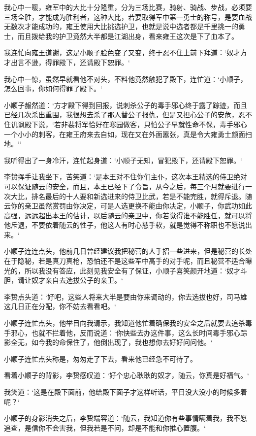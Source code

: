我心中一暖，雍军中的大比十分隆重，分为三场比赛，骑射、骑战、步战，必须要三场全胜，才能成为胜利者，这种大比，若要取得军中第一勇士的称号，是要血战无数次才能成功的，雍王使用大比挑选护卫，也就是说中选者都是千里挑一的勇士，而且拨给我的护卫竟然大半都是江湖出身，看来雍王这次是下了血本了。

我连忙向雍王道谢，这是小顺子脸色变了又变，终于忍不住上前下拜道：‘奴才方才出言不逊，得罪殿下，还请殿下恕罪。‘

我心中一惊，虽然早就看他不对头，不料他竟然触犯了殿下，连忙道：‘小顺子，怎么回事，你如何得罪了殿下。‘

小顺子赧然道：‘方才殿下得到回报，说刺杀公子的毒手邪心终于露了踪迹，而且已经几次杀出重围，我很想去杀了那人替公子报仇，但是又担心公子的安危，忍不住讥讽殿下说，‘若非裴将军恰好在寒园做客，只怕公子早就性命不保，毒手邪心一个小小的刺客，在雍王府来去自如，现在又在外面嚣张，真是令大雍勇士颜面扫地。‘‘

我听得出了一身冷汗，连忙起身道：‘小顺子无知，冒犯殿下，还请殿下恕罪。‘

李贽挥手让我坐下，苦笑道：‘是本王对不住你们主仆，这次本王精选的侍卫绝对可以保证随云的安全，而且，本王已经下了令旨，从今之后，每三个月就要进行一次大比，排名最后的十人要和新选进来的侍卫比武，若是不能完胜，就得斥退。随云你的亲卫虽然赏罚由你决定，可是人选更换不能由你决定，小顺子，你武功如此高强，远远超出本王的估计，以后随云的亲卫中，你若觉得谁不能胜任，就可以将他斥退，不要依着随云的性子，他这人有时心慈手软，就是觉得不称职也不愿说出来。‘

小顺子连连点头，他前几日曾经建议我把秘营的人手招一些进来，但是秘营的长处在于隐秘，若是真刀真枪，恐怕还不是这些军中高手的对手呢，而且秘营不适合曝光的，所以我没有答应，此刻见我安全有了保证，小顺子喜笑颜开地道：‘奴才斗胆，请让奴才亲自去选拔公子的亲卫。‘

李贽点头道：‘好吧，这些人将来大半是要由你来调动的，你去选拔也好，司马雄这几日正在分配，你不妨去看看吧。‘

小顺子连忙点头，他举目向我请示，我知道他忙着确保我的安全之后就要去追杀毒手邪心，也就不拦着他，反而说道：‘你快些去办这件事，这么长时间毒手邪心踪影全无，如今我的命保住了，他倒出现了，我也想你去好好问问他。‘

小顺子连忙点头称是，匆匆走了下去，看来他已经急不可待了。

看着小顺子的背影，李贽感叹道：‘好个忠心耿耿的奴才，随云，你真是好福气。‘

我笑道：‘这是在殿下面前，他给殿下面子才这样听话，平日没大没小的时候多着呢？‘

小顺子的身影消失之后，李贽端容道：‘随云，我知道你有些事情瞒着我，我不愿追查，是信你不会害我，但我若是不问，却是不能和你推心置腹。‘


